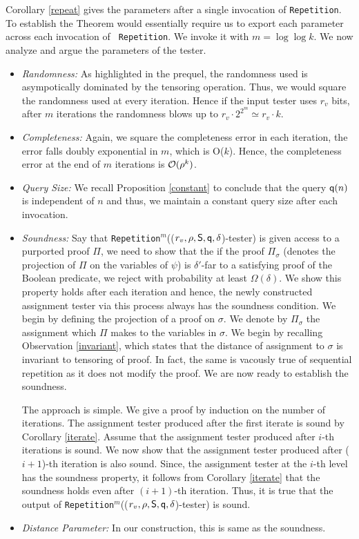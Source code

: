 Corollary \ref{repeat} gives the parameters after a single invocation
of {\tt Repetition}. To establish the Theorem would essentially
require us to export each parameter across each invocation of {\tt
  Repetition}. We invoke it with $m = \log \log k$. We now analyze
and argue the parameters of the tester.
\begin{itemize}

\item {\em Randomness:} As highlighted in the prequel, the randomness
  used is asympotically dominated by the tensoring operation. Thus, we
  would square the randomness used at every iteration. Hence if the
  input tester uses $r_v$ bits, after $m$ iterations the randomness
  blows up to $r_v \cdot 2^{2^{m}} \simeq r_v \cdot k$.

\item {\em Completeness:} Again, we square the completeness error in
  each iteration, the error falls doubly exponential in $m$, which is
  {\cal O}($k$). Hence, the completeness error at the end of $m$
  iterations is ${\cal O}(\rho^k)$.

\item {\em Query Size:} We recall Proposition \ref{constant} to
  conclude that the query ${\sf q}(n)$ is independent of $n$ and thus, we
  maintain a constant query size after each invocation.

\item{\em Soundness:} Say that {\tt Repetition}$^m$(($r_v, \rho, {\sf S}, {\sf q}, \delta$)-tester) is given access 
to a purported proof $\Pi$,  we need to show that the if the proof $\Pi_{\sigma}$ (denotes
 the projection of $\Pi$ on the variables of $\psi$) is $\delta'$-far to a satisfying proof of 
the Boolean predicate, we reject with probability at least $\Omega(\delta)$. We show this 
property holds after each iteration and hence, the newly constructed assignment tester via this 
process always has the soundness condition. We begin by defining the projection 
of a proof on $\sigma$.  We denote by $\Pi_\sigma$ the assignment which $\Pi$ makes to the variables in
$\sigma$. We begin by recalling Observation \ref{invariant}, which states that the distance of assignment to 
$\sigma$ is invariant to tensoring of proof. In fact, the same is vacously true of sequential repetition
as it does not modify the proof. We are now ready to establish the soundness.

The approach is simple. We give a proof by induction on the number of iterations. The assignment 
tester produced after the first iterate is sound by Corollary \ref{iterate}. Assume that the assignment 
tester produced after $i$-th iterations is sound. We now show that the assignment tester produced after ($i+1$)-th iteration is also sound. 
Since, the assignment tester at the $i$-th level has the soundness property, it follows 
from Corollary \ref{iterate} that the soundness holds even after $(i+1)$-th iteration. Thus, it is true
that the output of {\tt Repetition}$^m$(($r_v, \rho, {\sf S}, {\sf q}, \delta$)-tester)  is sound.



\item {\em Distance Parameter:} In our construction, this is same as
  the soundness.
\end{itemize} 
